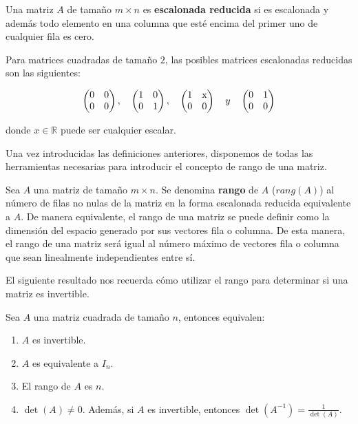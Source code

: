 \begin{definicion}
    Una matriz $A$ de tamaño $m \times n$ es \textbf{escalonada reducida} si es escalonada y además todo elemento en una columna que esté encima del primer uno de cualquier fila es cero.
\end{definicion}

\begin{ejemplo}
    Para matrices cuadradas de tamaño $2$, las posibles matrices escalonadas reducidas son las siguientes:

    \[
        \begin{pmatrix} 0 & 0 \\ 0 & 0 \end{pmatrix}, \quad
        \begin{pmatrix} 1 & 0 \\ 0 & 1 \end{pmatrix}, \quad
        \begin{pmatrix} 1 & $x$ \\ 0 & 0 \end{pmatrix} \quad y \quad
        \begin{pmatrix} 0 & 1 \\ 0 & 0
        \end{pmatrix}
    \]

    donde $x \in \mathbb{R}$ puede ser cualquier escalar.\newline
\end{ejemplo}

Una vez introducidas las definiciones anteriores, disponemos de todas las herramientas necesarias para introducir el concepto de rango de una matriz.

\begin{definicion}
    Sea $A$ una matriz de tamaño $m \times n$. Se denomina \textbf{rango} de $A$ ($rang(A)$) al número de filas no nulas de la matriz en la forma escalonada reducida equivalente a $A$. De manera equivalente, el rango de una matriz se puede definir como la dimensión del espacio generado por sus vectores fila o columna. De esta manera, el rango de una matriz será igual al número máximo de vectores fila o columna que sean linealmente independientes entre sí.\newline
\end{definicion}

El siguiente resultado nos recuerda cómo utilizar el rango para determinar si una matriz es invertible.

\begin{proposicion}
    Sea $A$ una matriz cuadrada de tamaño $n$, entonces equivalen:

    \begin{enumerate}
        \item $A$ es invertible.
        \item $A$ es equivalente a $I_n$.
        \item El rango de $A$ es $n$.
        \item $\det(A) \neq 0$. Además, si $A$ es invertible, entonces $\det(A^{-1})=\frac{1}{\det(A)}$.\newline
    \end{enumerate}
\end{proposicion}

